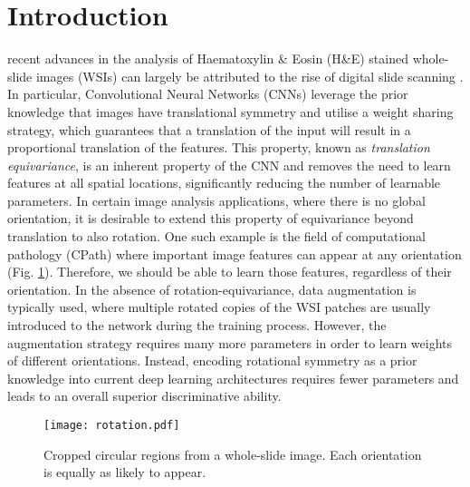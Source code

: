 \documentclass[journal]{IEEEtran}
\newcommand\mg[1]{{\color{black}{#1}}}
\begin{document}
\IEEEpeerreviewmaketitle


\section{Introduction} \label{section:intro}

  recent advances in the analysis of Haematoxylin \& Eosin (H\&E) stained whole-slide images (WSIs) can largely be attributed to the rise of digital slide scanning \cite{snead2016validation}. In particular, Convolutional Neural Networks (CNNs) leverage the prior knowledge that images have translational symmetry and utilise a weight sharing strategy, which guarantees that a translation of the input will result in a proportional translation of the features. This property, known as \textit{translation equivariance}, is an inherent property of the CNN and removes the need to learn features at all spatial locations, significantly reducing the number of learnable parameters. In certain image analysis applications, where there is no global orientation, it is desirable to extend this property of equivariance beyond translation to also rotation. One such example is the field of computational pathology (CPath) where important image features can appear at any orientation (Fig. \ref{dup1 fig:rotation}). Therefore, we should be able to learn those features, regardless of their orientation. In the absence of rotation-equivariance, data augmentation is typically used, where multiple rotated copies of the WSI patches are usually introduced to the network during the training process. However, the augmentation strategy requires many more parameters in order to learn weights of different orientations. Instead, encoding rotational symmetry as a prior knowledge into current deep learning architectures \mg{by enforcing rotation-equivariance} requires fewer parameters and leads to an overall superior discriminative ability. \mg{Also, rotation-equivariant CNNs typically converge quicker because the network does not need to spend time learning different filter orientations.}
 
 	\begin{figure}[t]
		\centering
        \texttt{[image: rotation.pdf]}
		\caption{Cropped circular regions from a whole-slide image. Each orientation is equally as likely to appear.} 
		\label{dup1 fig:rotation}
	\end{figure}
\end{document}

